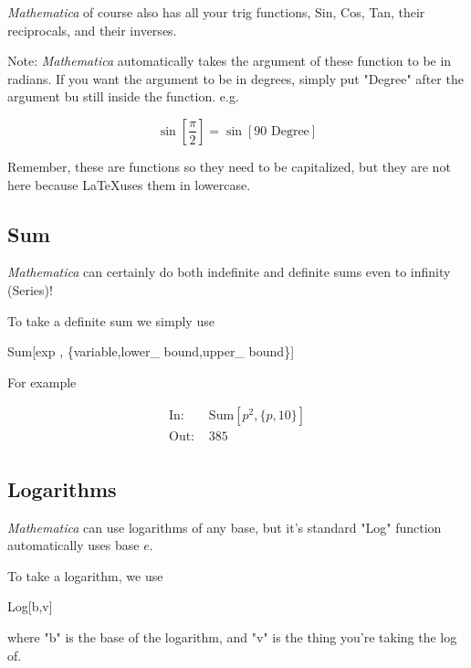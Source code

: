 \documentclass[11pt,a4paper,twoside]{article}
\begin{document}
				\textit{Mathematica} of course also has all your trig functions, Sin, Cos, Tan, their reciprocals, and their inverses.  
						
				Note: \textit{Mathematica} automatically takes the argument of these function to be in radians.  If you want the argument to be in degrees, simply put "Degree" after the argument bu still inside the function.  e.g. 
						
				\[ \sin\left[ \frac{ \pi }{2} \right] = \sin[ 90 \text{ Degree} ] \]
						
				Remember, these are functions so they need to be capitalized, but they are not here because \LaTeX uses them in lowercase.
						
			\subsection{Sum}
						
				\textit{Mathematica} can certainly do both indefinite and definite sums even to infinity (Series)!
						
				To take a definite sum we simply use 

				\begin{center} Sum[exp , \{variable,lower\_ bound,upper\_ bound\}] \end{center}
						
					For example
						
					\begin{align*}
						\text{In: }& \text{Sum} [ p^2 , \{ p,10 \} ] \\
						\text{Out: }& 385 \\
					\end{align*}
					
			\subsection{Logarithms}
					
				\textit{Mathematica} can use logarithms of any base, but it's standard "Log" function automatically uses base $e$.
					
				To take a logarithm, we use
					
				\begin{center}
					
					Log[b,v]
					
				\end{center}
					
				where "b" is the base of the logarithm, and "v" is the thing you're taking the log of.
				
\end{document}
